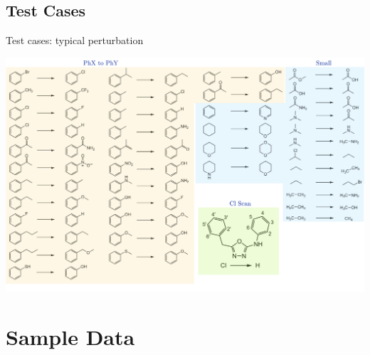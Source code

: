 \documentclass[10pt]{beamer}
\begin{document}

\subsection{Test Cases}


\begin{frame}{Test cases: typical perturbation}

\begin{center}
\includegraphics[scale=0.22]{figures/typical.png}
\end{center}

\end{frame}


\section{Sample Data}
\end{document}
